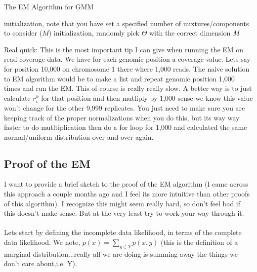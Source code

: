 \begin{algorithm}[!h]
 \caption{The EM Algorithm for GMM}
 initialization, note that you have set a specified number of mixtures/components to consider ($M$)\;
 initialization, randomly pick $\Theta$ with the correct dimension $M$\;
 
\end{algorithm}

Real quick: This is the most important tip I can give when running the EM on read coverage data. We have for each genomic position a coverage value. Lets say for position 10,000 on chromosome 1 there where 1,000 reads. The naive solution to EM algorithm would be to make a list and repeat genomic position 1,000 times and run the EM. This of course is really really slow. A better way is to just calculate $r_i^k$ for that position and then mutliply by 1,000 sense we know this value won't change for the other 9,999 replicates. You just need to make sure you are keeping track of the proper normalizations when you do this, but its way way faster to do mutltiplication then do a for loop for 1,000 and calculated the same normal/uniform distribution over and over again. 


\subsection{Proof of the EM}
I want to provide a brief sketch to the proof of the EM algorithm (I came across this approach a couple months ago and I feel its more intuitive than other proofs of this algorithm).  I recognize this might seem really hard, so don't feel bad if this doesn't make sense. But at the very least try to work your way through it. 
\\
\\
\noindent
Lets start by defining the incomplete data likelihood, in terms of the complete data likelihood. We note, $p(x) = \sum_{y\in Y} p(x,y)$ (this is the definition of a marginal distribution...really all we are doing is summing away the things we don't care about,i.e. Y). 

